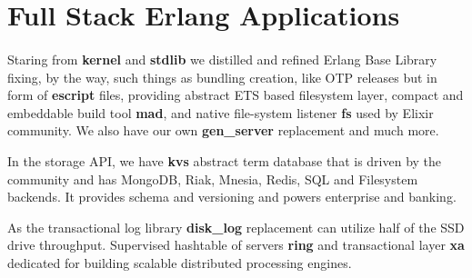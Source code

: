 \documentclass[11pt]{article}
\begin{document}


\section*{Full Stack Erlang Applications}
\paragraph{}

Staring from {\bf kernel} and {\bf stdlib} we distilled and refined
Erlang Base Library fixing, by the way, such things as
bundling creation, like OTP releases but in form of
{\bf escript} files, providing abstract ETS based filesystem layer,
compact and embeddable build tool {\bf mad}, and native file-system
listener {\bf fs} used by Elixir community. We also have our own
{\bf gen_server} replacement and much more.

In the storage API, we have {\bf kvs} abstract term database
that is driven by the community and has MongoDB, Riak, Mnesia, Redis, SQL
and Filesystem backends. It provides schema and versioning
and powers enterprise and banking.

As the transactional log library {\bf disk_log} replacement can
utilize half of the SSD drive throughput. Supervised hashtable
of servers {\bf ring} and transactional layer {\bf xa} dedicated for building
scalable distributed processing engines.



\end{document}

